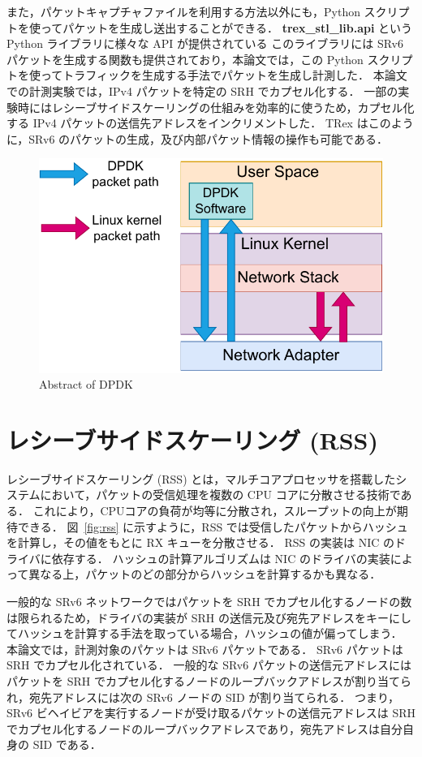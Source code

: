 また，パケットキャプチャファイルを利用する方法以外にも，Python スクリプトを使ってパケットを生成し送出することができる．
\textbf{trex\_stl\_lib.api} という Python ライブラリに様々な API が提供されている
このライブラリには SRv6 パケットを生成する関数も提供されており，本論文では，この Python スクリプトを使ってトラフィックを生成する手法でパケットを生成し計測した．
本論文での計測実験では，IPv4 パケットを特定の SRH でカプセル化する．
一部の実験時にはレシーブサイドスケーリングの仕組みを効率的に使うため，カプセル化する IPv4 パケットの送信先アドレスをインクリメントした．
TRex はこのように，SRv6 のパケットの生成，及び内部パケット情報の操作も可能である．

\begin{figure}[t]
    \centering
    \includegraphics[width=0.95\linewidth]{img/DPDK.pdf}
    \caption{Abstract of DPDK}
    \label{fig:dpdk}
\end{figure}

\section{レシーブサイドスケーリング (RSS)}
\label{sec:rss}
レシーブサイドスケーリング (RSS) とは，マルチコアプロセッサを搭載したシステムにおいて，パケットの受信処理を複数の CPU コアに分散させる技術である．
これにより，CPUコアの負荷が均等に分散され，スループットの向上が期待できる．
図~\ref*{fig:rss} に示すように，RSS では受信したパケットからハッシュを計算し，その値をもとに RX キューを分散させる．
RSS の実装は NIC のドライバに依存する．
ハッシュの計算アルゴリズムは NIC のドライバの実装によって異なる上，パケットのどの部分からハッシュを計算するかも異なる．

一般的な SRv6 ネットワークではパケットを SRH でカプセル化するノードの数は限られるため，ドライバの実装が SRH の送信元及び宛先アドレスをキーにしてハッシュを計算する手法を取っている場合，ハッシュの値が偏ってしまう．
本論文では，計測対象のパケットは SRv6 パケットである．
SRv6 パケットは SRH でカプセル化されている．
一般的な SRv6 パケットの送信元アドレスにはパケットを SRH でカプセル化するノードのループバックアドレスが割り当てられ，宛先アドレスには次の SRv6 ノードの SID が割り当てられる．
つまり，SRv6 ビヘイビアを実行するノードが受け取るパケットの送信元アドレスは SRH でカプセル化するノードのループバックアドレスであり，宛先アドレスは自分自身の SID である．

